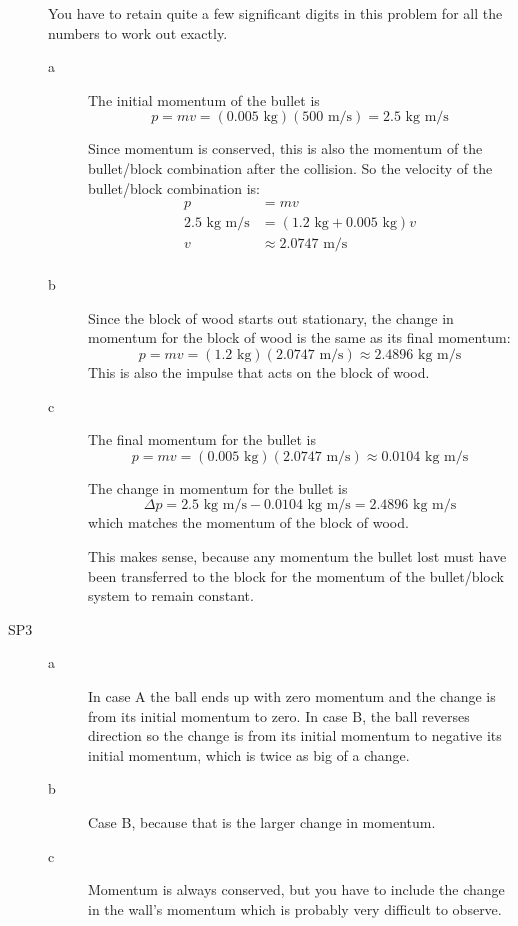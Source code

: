 \documentclass{exam}
\begin{document}
\begin{description}
You have to retain quite a few significant digits in this problem for all the numbers to work out exactly.

\begin{description}

\item[a]
The initial momentum of the bullet is 
\[ p = mv = (0.005 \text{ kg})(500 \text{ m/s}) = 2.5 \text{ kg m/s} \]

Since momentum is conserved, this is also the momentum of the bullet/block combination after the collision.  So the
velocity of the bullet/block combination is:
\begin{align*}
  p &= mv \\
  2.5 \text{ kg m/s} &= (1.2 \text{ kg} + 0.005 \text{ kg}) v \\
  v &\approx 2.0747 \text{ m/s} \\
\end{align*}

\item[b]
Since the block of wood starts out stationary, the change in momentum for the block of wood is the same as its final
momentum: 
\[
  p = mv = (1.2 \text{ kg})(2.0747 \text{ m/s}) \approx 2.4896 \text{ kg m/s}
\]
This is also the impulse that acts on the block of wood.

\item[c]

The final momentum for the bullet is
\[
  p = mv = (0.005 \text{ kg})(2.0747 \text{ m/s}) \approx 0.0104 \text{ kg m/s}
\]

The change in momentum for the bullet is 
\[
\Delta p = 2.5 \text{ kg m/s} - 0.0104 \text{ kg m/s} = 2.4896 \text{ kg m/s}
\]
which matches the momentum of the block of wood.

This makes sense, because any momentum the bullet lost must have been transferred to the block for the momentum of the bullet/block
system to remain constant.

\end{description}

\item[SP3]
\begin{description}
\item[a]
In case A the ball ends up with zero momentum and the change is from its initial momentum to zero.  In case B, the
ball reverses direction so the change is from its initial momentum to negative its initial momentum, which is twice as
big of a change.

\item[b]
Case B, because that is the larger change in momentum.

\item[c]
Momentum is always conserved, but you have to include the change in the wall's momentum which is probably very difficult to
observe.

\end{description}

\end{description}
\end{document}

